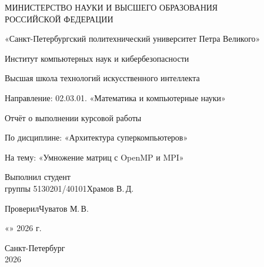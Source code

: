 \begin{titlepage}
\thispagestyle{empty}

\begin{center}
МИНИСТЕРСТВО НАУКИ И ВЫСШЕГО ОБРАЗОВАНИЯ\\
РОССИЙСКОЙ ФЕДЕРАЦИИ\par
\vspace{0.4em}
«Санкт-Петербургский политехнический университет Петра Великого»\par
Институт компьютерных наук и кибербезопасности\par
Высшая школа технологий искусственного интеллекта\par
Направление: 02.03.01. «Математика и компьютерные науки»
\end{center}

\vspace{3cm}

\begin{center}
{\large Отчёт о выполнении курсовой работы\par
По дисциплине: «Архитектура суперкомпьютеров»\par
На тему: «Умножение матриц с OpenMP и MPI»\par}
\end{center}

\vspace{3cm}

\noindent
\begin{minipage}{\textwidth}
Выполнил студент\\
группы 5130201/40101\hfill\underline{\hspace{3cm}}\enspace Храмов В.\,Д.
\end{minipage}

\vspace{1cm}

\noindent
Проверил\hfill\underline{\hspace{3cm}}\enspace Чуватов М.\,В.

\vspace{1cm}

\begin{flushright}
{\large «\underline{\hspace{1cm}}» \underline{\hspace{3cm}} 2026 г.}
\end{flushright}

\vfill

\begin{center}
Санкт-Петербург\\
2026
\end{center}

\end{titlepage}
\setcounter{page}{2}
